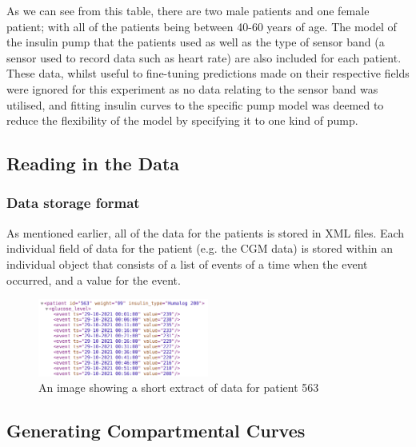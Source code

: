      As we can see from this table, there are two male patients and one female patient; with all of the patients being between 40-60 years of age. The model of the insulin pump that the patients used as well as the type of sensor band (a sensor used to record data such as heart rate) are also included for each patient. These data, whilst useful to fine-tuning predictions made on their respective fields were ignored for this experiment as no data relating to the sensor band was utilised, and fitting insulin curves to the specific pump model was deemed to reduce the flexibility of the model by specifying it to one kind of pump.

      \subsection{Reading in the Data}

        \subsubsection{Data storage format}
          As mentioned earlier, all of the data for the patients is stored in XML files. Each individual field of data for the patient (e.g. the CGM data) is stored within an individual object that consists of a list of events of a time when the event occurred, and a value for the event.

          \begin{figure}[H]
            \centering
            \includegraphics[width=0.5\textwidth]{images/XMlFile.png} 
            \caption{
             An image showing a short extract of data for patient 563
            }
          \end{figure}
          
        \subsubsection{}

      \subsection{Generating Compartmental Curves}

